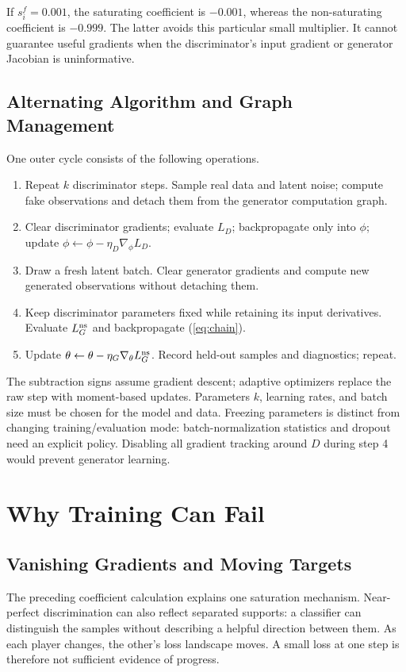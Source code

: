 \documentclass[conference]{IEEEtran}
\begin{document}
If $s_i^f=0.001$, the saturating coefficient is $-0.001$, whereas the non-saturating coefficient is $-0.999$. The latter avoids this particular small multiplier. It cannot guarantee useful gradients when the discriminator's input gradient or generator Jacobian is uninformative.

\subsection{Alternating Algorithm and Graph Management}
One outer cycle consists of the following operations.
\begin{enumerate}
\item Repeat $k$ discriminator steps. Sample real data and latent noise; compute fake observations and detach them from the generator computation graph.
\item Clear discriminator gradients; evaluate $L_D$; backpropagate only into $\phi$; update $\phi\leftarrow\phi-\eta_D\nabla_\phi L_D$.
\item Draw a fresh latent batch. Clear generator gradients and compute new generated observations without detaching them.
\item Keep discriminator parameters fixed while retaining its input derivatives. Evaluate $L_G^{\rm ns}$ and backpropagate (\ref{eq:chain}).
\item Update $\theta\leftarrow\theta-\eta_G\nabla_\theta L_G^{\rm ns}$. Record held-out samples and diagnostics; repeat.
\end{enumerate}
The subtraction signs assume gradient descent; adaptive optimizers replace the raw step with moment-based updates. Parameters $k$, learning rates, and batch size must be chosen for the model and data. Freezing parameters is distinct from changing training/evaluation mode: batch-normalization statistics and dropout need an explicit policy. Disabling all gradient tracking around $D$ during step 4 would prevent generator learning.

\section{Why Training Can Fail}
\subsection{Vanishing Gradients and Moving Targets}
The preceding coefficient calculation explains one saturation mechanism. Near-perfect discrimination can also reflect separated supports: a classifier can distinguish the samples without describing a helpful direction between them. As each player changes, the other's loss landscape moves. A small loss at one step is therefore not sufficient evidence of progress.
\end{document}
